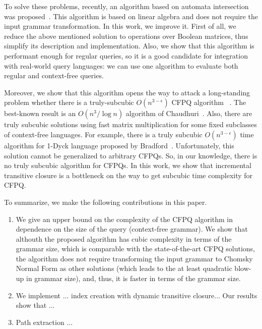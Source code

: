 To solve these problems, recently, an algorithm based on automata intersection was proposed~\cite{10.1007/978-3-030-54832-2_6}.
This algorithm is based on linear algebra and does not require the input grammar transformation.
In this work, we improve it.
First of all, we reduce the above mentioned solution to operations over Boolean matrices, thus simplify its description and implementation.
Also, we show that this algorithm is performant enough for regular queries, so it is a good candidate for integration with real-world query languages: we can use one algorithm to evaluate both regular and context-free queries. 

Moreover, we show that this algorithm opens the way to attack a long-standing problem whether there is a truly-subcubic $O(n^{3-\epsilon})$ CFPQ algorithm ~\cite{10.1145/1328438.1328460, Yannakakis}. 
The best-known result is an $O(n^3/\log{n})$ algorithm of Chaudhuri~\cite{10.1145/1328438.1328460}. 
Also, there are truly subcubic solutions using fast matrix multiplication for some fixed subclasses of context-free languages. 
For example, there is a truly subcubic  $O(n^{3-\epsilon})$ time algorithm for 1-Dyck language proposed by Bradford~\cite{8249039}.
Unfortunately, this solution cannot be generalized to arbitrary CFPQs. 
So, in our knowledge, there is no truly subcubic algorithm for CFPQs. 
In this work, we show that incremental transitive closure is a bottleneck on the way to get subcubic time complexity for CFPQ.

To summarize, we make the following contributions in this paper.
\begin{enumerate}
        \item We give an upper bound on the complexity of the CFPQ algorithm in dependence on the size of the query (context-free grammar). We show that althouth the proposed algorithm has cubic complexity in terms of the grammar size, which is comparable with the state-of-the-art CFPQ solutions, the algorithm does not require transforming the input grammar to Chomsky Normal Form as other solutions (which leads to the at least quadratic blow-up in grammar size), and, thus, it is faster in terms of the grammar size.
	\item We implement ... index creation with dynamic transitive closure... Our results show that ...
         \item Path extraction ...
\end{enumerate}